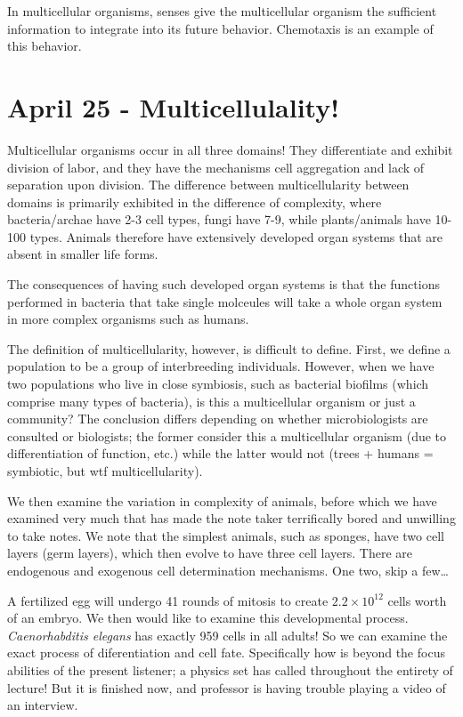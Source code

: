 \documentclass[12pt]{article}
\newcommand{\scinot}[2]{#1\times 10^{#2}}
\begin{document}
In multicellular organisms, senses give the multicellular organism the sufficient information to integrate into its future behavior. Chemotaxis is an example of this behavior. 


\section*{April 25 - Multicellulality!}

Multicellular organisms occur in all three domains! They differentiate and exhibit division of labor, and they have the mechanisms cell aggregation and lack of separation upon division. The difference between multicellularity between domains is primarily exhibited in the difference of complexity, where bacteria/archae have 2-3 cell types, fungi have 7-9, while plants/animals have 10-100 types. Animals therefore have extensively developed organ systems that are absent in smaller life forms. 

The consequences of having such developed organ systems is that the functions performed in bacteria that take single molceules will take a whole organ system in more complex organisms such as humans.

The definition of multicellularity, however, is difficult to define. First, we define a population to be a group of interbreeding individuals. However, when we have two populations who live in close symbiosis, such as bacterial biofilms (which comprise many types of bacteria), is this a multicellular organism or just a community? The conclusion differs depending on whether microbiologists are consulted or biologists; the former consider this a multicellular organism (due to differentiation of function, etc.) while the latter would not (trees + humans = symbiotic, but wtf multicellularity). 

We then examine the variation in complexity of animals, before which we have examined very much that has made the note taker terrifically bored and unwilling to take notes. We note that the simplest animals, such as sponges, have two cell layers (germ layers), which then evolve to have three cell layers. There are endogenous and exogenous cell determination mechanisms. One two, skip a few\dots

A fertilized egg will undergo 41 rounds of mitosis to create $\scinot{2.2}{12}$ cells worth of an embryo. We then would like to examine this developmental process. \emph{Caenorhabditis elegans} has exactly 959 cells in all adults! So we can examine the exact process of diferentiation and cell fate. Specifically how is beyond the focus abilities of the present listener; a physics set has called throughout the entirety of lecture! But it is finished now, and professor is having trouble playing a video of an interview.
\end{document}
